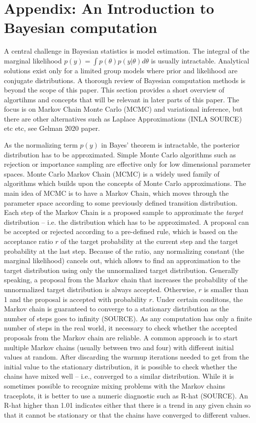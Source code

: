 \chapter{Appendix: An Introduction to Bayesian computation}

\label{ch:computation}

A central challenge in Bayesian statistics is model estimation.
The integral of the marginal likelihood $p(y) = \int p(\theta)p(y|\theta)d\theta$ is usually intractable.
Analytical solutions exist only for a limited group models where prior and likelihood are conjugate distributions.
A thorough review of Bayesian computation methods is beyond the scope of this paper.
This section provides a short overview of algortihms and concepts that will be relevant in later parts of this paper.
The focus is on Markov Chain Monte Carlo (MCMC) and variational inference, but there are other alternatives such as Laplace Approximations (INLA SOURCE) etc etc, see Gelman 2020 paper.

As the normalizing term $p(y)$ in Bayes' theorem is intractable, the posterior distribution has to be approximated.
Simple Monte Carlo algorithms such as rejection or importance sampling are effective only for low dimensional parameter spaces.
Monte Carlo Markov Chain (MCMC) is a widely used family of algorithms which builds upon the concepts of Monte Carlo approximations.
The main idea of MCMC is to have a Markov Chain, which moves through the parameter space according to some previously defined transition distribution.
Each step of the Markov Chain is a proposed sample to approximate the \textit{target} distribution – i.e. the distribution which has to be approximated.
A proposal can be accepted or rejected according to a pre-defined rule, which is based on the acceptance ratio $r$ of the target probability at the current step and the target probability at the last step.
Because of the ratio, any normalizing constant (the marginal likelihood) cancels out, which allows to find an approximation to the target distribution using only the unnormalized target distribution.
Generally speaking, a proposal from the Markov chain that increases the probability of the unnormalized target distribution is always accepted.
Otherwise, $r$ is smaller than 1 and the proposal is accepted with probability $r$.
Under certain conditons, the Markov chain is guaranteed to converge to a stationary distribution as the number of steps goes to infinity (SOURCE).
As any computation has only a finite number of steps in the real world, it necessary to check whether the accepted proposals from the Markov chain are reliable.
A common approach is to start multiple Markov chains (usually between two and four) with different initial values at random.
After discarding the warmup iterations needed to get from the initial value to the stationary distribution, it is possible to check whether the chains have mixed well – i.e., converged to a similar distribution.
While it is sometimes possible to recognize mixing problems with the Markov chains traceplots, it is better to use a numeric diagnostic such as R-hat (SOURCE).
An R-hat higher than 1.01 indicates either that there is a trend in any given chain so that it cannot be stationary or that the chains have converged to different values.

